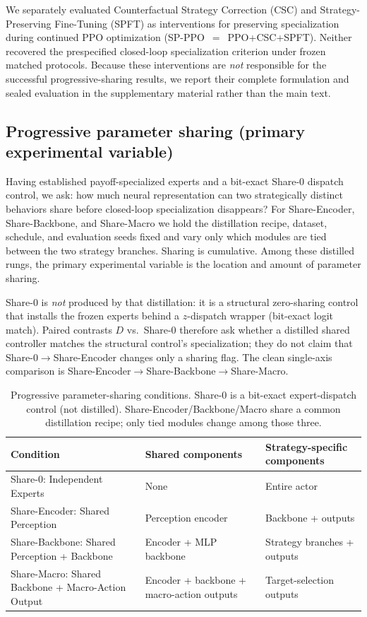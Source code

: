 We separately evaluated Counterfactual Strategy Correction (CSC) and
Strategy-Preserving Fine-Tuning (SPFT) as interventions for preserving
specialization during continued PPO optimization (SP-PPO~$=$~PPO+CSC+SPFT).
Neither recovered the prespecified closed-loop specialization criterion under
frozen matched protocols. Because these interventions are \emph{not} responsible
for the successful progressive-sharing results, we report their complete
formulation and sealed evaluation in the supplementary material rather than the
main text.

\subsection{Progressive parameter sharing (primary experimental variable)}
\label{sec:sharing}

Having established payoff-specialized experts and a bit-exact Share-0 dispatch
control, we ask: how much neural representation can two strategically distinct
behaviors share before closed-loop specialization disappears? For
Share-Encoder, Share-Backbone, and Share-Macro we hold the distillation recipe,
dataset, schedule, and evaluation seeds fixed and vary only which modules are
tied between the two strategy branches. Sharing is cumulative. Among these
distilled rungs, the primary experimental variable is the location and amount of
parameter sharing.

Share-0 is \emph{not} produced by that distillation: it is a structural
zero-sharing control that installs the frozen experts behind a $z$-dispatch
wrapper (bit-exact logit match). Paired contrasts $D$ vs.\ Share-0 therefore
ask whether a distilled shared controller matches the structural control's
specialization; they do not claim that Share-0$\rightarrow$Share-Encoder
changes only a sharing flag. The clean single-axis comparison is
Share-Encoder$\rightarrow$Share-Backbone$\rightarrow$Share-Macro.

\begin{table}[t]
\centering
\caption{Progressive parameter-sharing conditions. Share-0 is a bit-exact
expert-dispatch control (not distilled). Share-Encoder/Backbone/Macro share a
common distillation recipe; only tied modules change among those three.}
\label{tab:sharing}
\begin{tabular}{lll}
\toprule
\textbf{Condition} & \textbf{Shared components} & \textbf{Strategy-specific components} \\
\midrule
Share-0: Independent Experts
  & None
  & Entire actor \\
Share-Encoder: Shared Perception
  & Perception encoder
  & Backbone + outputs \\
Share-Backbone: Shared Perception + Backbone
  & Encoder + MLP backbone
  & Strategy branches + outputs \\
Share-Macro: Shared Backbone + Macro-Action Output
  & Encoder + backbone + macro-action outputs
  & Target-selection outputs \\
\bottomrule
\end{tabular}
\end{table}

